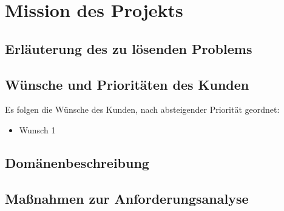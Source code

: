 \section{Mission des Projekts}

\subsection{Erläuterung des zu lösenden Problems}

\subsection{Wünsche und Prioritäten des Kunden}
	Es folgen die Wünsche des Kunden, nach absteigender Priorität geordnet:
	\begin{itemize}
		\item Wunsch 1
	\end{itemize}

\subsection{Domänenbeschreibung}
	
\subsection{Maßnahmen zur Anforderungsanalyse}